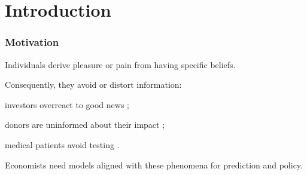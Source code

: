 \documentclass[usenames,dvipsnames,aspectratio=169,11pt, envcountsect, handout]{beamer}
\begin{document}
\section{Introduction}

\begin{frame}
	\maketitle

\end{frame}

\begin{frame}\frametitle{Motivation}

	Individuals derive pleasure or pain from having specific beliefs.

	\vfill

	Consequently, they avoid or distort information:

	\vfill

	\begin{wideitemize}
		\item investors overreact to good news \citep{danielOverconfidentInvestorsPredictable2015};
		\item donors are uninformed about their impact \citep{niehausTheoryGoodIntentions2014};
		\item medical patients avoid testing \citep{golmanInformationAvoidance2017}.
	\end{wideitemize}

	\vfill

	Economists need models aligned with these phenomena for prediction and policy.

\end{frame}
\end{document}

